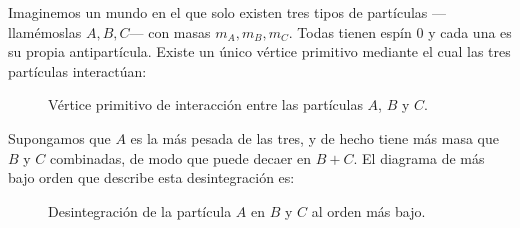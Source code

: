 \bigskip

Imaginemos un mundo en el que solo existen tres tipos de partículas —llamémoslas $A, B, C$— con masas 
$m_A, m_B, m_C$. Todas tienen espín $0$ y cada una es su propia antipartícula. Existe un único vértice 
primitivo mediante el cual las tres partículas interactúan:

\begin{figure}[h!]
    \centering
    \caption{Vértice primitivo de interacción entre las partículas $A$, $B$ y $C$.}
\end{figure}

Supongamos que $A$ es la más pesada de las tres, y de hecho tiene más masa que 
$B$ y $C$ combinadas, de modo que puede decaer en $B + C$. 
El diagrama de más bajo orden que describe esta desintegración es:

\begin{figure}[h!]
    \centering
    \caption{Desintegración de la partícula $A$ en $B$ y $C$ al orden más bajo.}
\end{figure}


